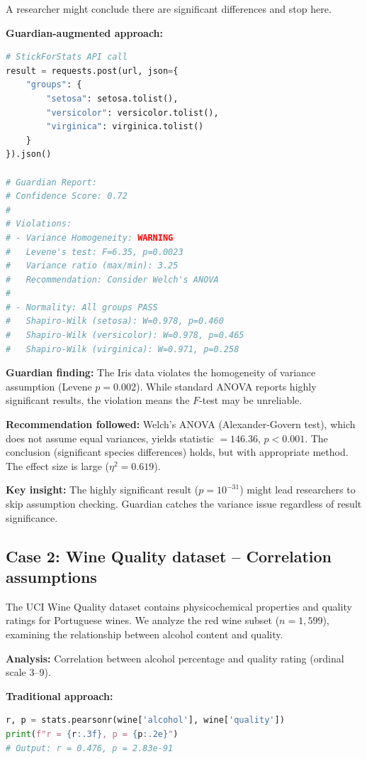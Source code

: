 \documentclass[article]{jss}
\begin{document}
A researcher might conclude there are significant differences and stop here.

\textbf{Guardian-augmented approach:}

\begin{lstlisting}[language=Python]
# StickForStats API call
result = requests.post(url, json={
    "groups": {
        "setosa": setosa.tolist(),
        "versicolor": versicolor.tolist(),
        "virginica": virginica.tolist()
    }
}).json()

# Guardian Report:
# Confidence Score: 0.72
#
# Violations:
# - Variance Homogeneity: WARNING
#   Levene's test: F=6.35, p=0.0023
#   Variance ratio (max/min): 3.25
#   Recommendation: Consider Welch's ANOVA
#
# - Normality: All groups PASS
#   Shapiro-Wilk (setosa): W=0.978, p=0.460
#   Shapiro-Wilk (versicolor): W=0.978, p=0.465
#   Shapiro-Wilk (virginica): W=0.971, p=0.258
\end{lstlisting}

\textbf{Guardian finding:} The Iris data violates the homogeneity of variance assumption (Levene $p = 0.002$). While standard ANOVA reports highly significant results, the violation means the $F$-test may be unreliable.

\textbf{Recommendation followed:} Welch's ANOVA (Alexander-Govern test), which does not assume equal variances, yields statistic $= 146.36$, $p < 0.001$. The conclusion (significant species differences) holds, but with appropriate method. The effect size is large ($\eta^2 = 0.619$).

\textbf{Key insight:} The highly significant result ($p = 10^{-31}$) might lead researchers to skip assumption checking. Guardian catches the variance issue regardless of result significance.

\subsection{Case 2: Wine Quality dataset -- Correlation assumptions}

The UCI Wine Quality dataset \citep{cortez2009wine} contains physicochemical properties and quality ratings for Portuguese wines. We analyze the red wine subset ($n = 1{,}599$), examining the relationship between alcohol content and quality.

\textbf{Analysis:} Correlation between alcohol percentage and quality rating (ordinal scale 3--9).

\textbf{Traditional approach:}
\begin{lstlisting}[language=Python]
r, p = stats.pearsonr(wine['alcohol'], wine['quality'])
print(f"r = {r:.3f}, p = {p:.2e}")
# Output: r = 0.476, p = 2.83e-91
\end{lstlisting}
\end{document}
